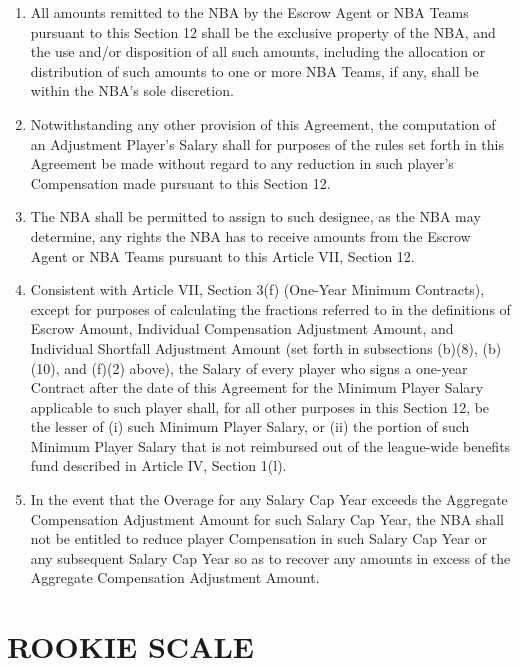 \documentclass[
]{book}
\providecommand{\tightlist}{%
  \setlength{\itemsep}{0pt}\setlength{\parskip}{0pt}}
\begin{document}
\begin{enumerate}
  \begin{enumerate}
  \def\labelenumii{(\arabic{enumii})}
  \tightlist
  \item
    All amounts remitted to the NBA by the Escrow Agent or NBA Teams pursuant to this Section 12 shall be the exclusive property of the NBA, and the use and/or disposition of all such amounts, including the allocation or distribution of such amounts to one or more NBA Teams, if any, shall be within the NBA's sole discretion.
  \item
    Notwithstanding any other provision of this Agreement, the computation of an Adjustment Player's Salary shall for purposes of the rules set forth in this Agreement be made without regard to any reduction in such player's Compensation made pursuant to this Section 12.
  \item
    The NBA shall be permitted to assign to such designee, as the NBA may determine, any rights the NBA has to receive amounts from the Escrow Agent or NBA Teams pursuant to this Article VII, Section 12.
  \item
    Consistent with Article VII, Section 3(f) (One-Year Minimum Contracts), except for purposes of calculating the fractions referred to in the definitions of Escrow Amount, Individual Compensation Adjustment Amount, and Individual Shortfall Adjustment Amount (set forth in subsections (b)(8), (b)(10), and (f)(2) above), the Salary of every player who signs a one-year Contract after the date of this Agreement for the Minimum Player Salary applicable to such player shall, for all other purposes in this Section 12, be the lesser of (i) such Minimum Player Salary, or (ii) the portion of such Minimum Player Salary that is not reimbursed out of the league-wide benefits fund described in Article IV, Section 1(l).
  \item
    In the event that the Overage for any Salary Cap Year exceeds the Aggregate Compensation Adjustment Amount for such Salary Cap Year, the NBA shall not be entitled to reduce player Compensation in such Salary Cap Year or any subsequent Salary Cap Year so as to recover any amounts in excess of the Aggregate Compensation Adjustment Amount.
  \end{enumerate}
\end{enumerate}

\hypertarget{rookie-scale}{%
\chapter{ROOKIE SCALE}\label{rookie-scale}}
\end{document}
